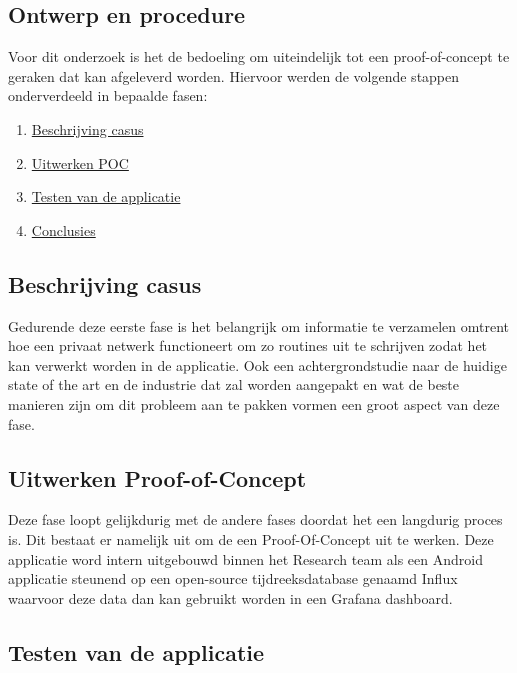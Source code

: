 \subsection{Ontwerp en procedure}

Voor dit onderzoek is het de bedoeling om uiteindelijk tot een proof-of-concept te geraken dat kan afgeleverd worden. Hiervoor werden de volgende stappen onderverdeeld in bepaalde fasen:

\begin{enumerate}
    \item \hyperref[subsub:beschrijving]{Beschrijving casus}
    \item \hyperref[subsub:uitwerking]{Uitwerken POC}
    \item \hyperref[subsub:testfase]{Testen van de applicatie}
    \item \hyperref[subsub:conclusies]{Conclusies}
\end{enumerate}

\subsection{Beschrijving casus}
\label{subsub:beschrijving}

Gedurende deze eerste fase is het belangrijk om informatie te verzamelen omtrent hoe een privaat netwerk functioneert om zo routines uit te schrijven zodat het kan verwerkt worden in de applicatie. Ook een achtergrondstudie naar de huidige state of the art en de industrie dat zal worden aangepakt en wat de beste manieren zijn om dit probleem aan te pakken vormen een groot aspect van deze fase. \\

\subsection{Uitwerken Proof-of-Concept}
\label{subsub:uitwerking}

Deze fase loopt gelijkdurig met de andere fases doordat het een langdurig proces is. Dit bestaat er namelijk uit om de een Proof-Of-Concept uit te werken. Deze applicatie word intern uitgebouwd binnen het Research team als een Android applicatie steunend op een open-source tijdreeksdatabase genaamd Influx waarvoor deze data dan kan gebruikt worden in een Grafana dashboard.

\subsection{Testen van de applicatie}
\label{subsub:testfase}

